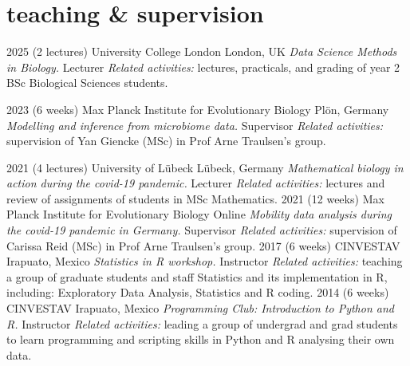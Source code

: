 \documentclass[]{friggeri-cv} %
\begin{document}

\section{teaching \& supervision}

\begin{entrylist}
\entry
{2025}
{(2 lectures)}
{University College London}
{London, UK}
{{\normalsize\emph{Data Science Methods in Biology.} Lecturer}}
{\emph{Related activities:} lectures, practicals, and grading of year 2 BSc Biological Sciences students.
}
\end{entrylist}
\begin{entrylist}
\entry
{2023}
{(6 weeks)}
{Max Planck Institute for Evolutionary Biology}
{Plön, Germany}
{{\normalsize\emph{Modelling and inference from microbiome data.} Supervisor}}
{\emph{Related activities:} supervision of Yan Giencke (MSc) in Prof Arne Traulsen's group.}
\end{entrylist}
\begin{entrylist}
\entry
{2021}
{(4 lectures)}
{University of Lübeck}
{Lübeck, Germany}
{{\normalsize\emph{Mathematical biology in action during the covid-19 pandemic.} Lecturer}}
{\emph{Related activities:} lectures and review of assignments of students in MSc Mathematics.}
\entry
{2021}
{(12 weeks)}
{Max Planck Institute for Evolutionary Biology}
{Online}
{{\normalsize\emph{Mobility data analysis during the covid-19 pandemic in Germany.} Supervisor}}
{\emph{Related activities:} supervision of Carissa Reid (MSc) in Prof Arne Traulsen's group.}
\entry
{2017}
{(6 weeks)}
{CINVESTAV}
{Irapuato, Mexico}
{{\normalsize\emph{Statistics in R workshop.} Instructor}}
{\emph{Related activities:} teaching a group of graduate students and staff Statistics and its implementation in R, including: Exploratory Data Analysis, Statistics and R coding.}
\entry
{2014}
{(6 weeks)}
{CINVESTAV}
{Irapuato, Mexico}
{{\normalsize\emph{Programming Club: Introduction to Python and R.} Instructor}}
{\emph{Related activities:} leading a group of undergrad and grad students to learn programming and scripting skills in Python and R analysing their own data.}
\end{entrylist}
\end{document}
